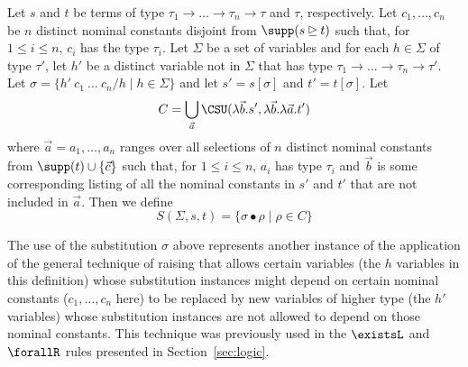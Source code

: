 \begin{definition}\label{def:s}
Let $s$ and $t$ be terms of type $\tau_1 \to \ldots \to \tau_n
\to \tau$ and $\tau$, respectively. Let $c_1,\ldots,c_n$ be $n$
distinct nominal constants disjoint from $\supp(s\unrhd t)$ such that,
for $1 \leq i \leq n$, $c_i$ has the type $\tau_i$. Let $\Sigma$ be a
set of variables and for each $h \in \Sigma$ of type $\tau'$, let
$h'$ be a distinct variable not in $\Sigma$ that has type
$\tau_1\to \ldots\to\tau_n\to \tau'$. Let $\sigma = \{h'\ c_1\ \ldots\
c_n/h \mid h \in \Sigma\}$ and let $s' = s[\sigma]$ and $t' =
t[\sigma]$. Let
\begin{equation*}
C = \bigcup_{\vec{a}} \CSU(\lambda \vec{b}.s', \lambda \vec{b}. \lambda\vec{a}.t')
\end{equation*}
where $\vec{a}= a_1,\ldots,a_n$ ranges over all selections of $n$
distinct nominal constants from $\supp(t)\cup \{\vec{c}\}$ such that,
for $1 \leq i \leq n$,
$a_i$ has type $\tau_i$ and $\vec{b}$ is some corresponding listing of
all the nominal constants in $s'$ and $t'$ that are not included in
$\vec{a}$.
Then we define
\begin{equation*}
S(\Sigma, s, t) = \{ \sigma \bullet \rho \mid \rho \in C \}
\end{equation*}
\end{definition}

The use of the substitution $\sigma$ above represents
another instance of the application of the general technique of
raising that allows
certain variables (the $h$ variables in this definition) whose
substitution instances might depend on certain nominal constants
($c_1,\ldots,c_n$ here) to be replaced by new variables of higher type
(the $h'$ variables) whose substitution instances are not allowed to
depend on those nominal constants. This technique was previously used
in the $\existsL$ and $\forallR$ rules presented in
Section~\ref{sec:logic}.

